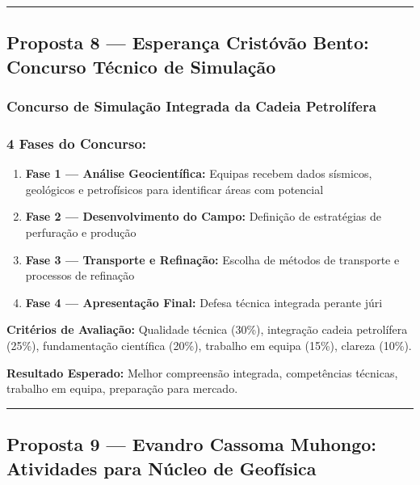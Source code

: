 \documentclass[12pt,a4paper]{article}
\begin{document}
\textcolor{spe-secondary}{\hspace{0.5cm}\rule{0.4\linewidth}{0.8pt}}

\subsection{Proposta 8 — Esperança Cristóvão Bento: Concurso Técnico de Simulação}

\subsubsection*{Concurso de Simulação Integrada da Cadeia Petrolífera}

\subsubsection*{4 Fases do Concurso:}

\begin{enumerate}[itemsep=0.15cm]
    \item \textbf{Fase 1 — Análise Geocientífica:} Equipas recebem dados sísmicos, geológicos e petrofísicos para identificar áreas com potencial
    
    \item \textbf{Fase 2 — Desenvolvimento do Campo:} Definição de estratégias de perfuração e produção
    
    \item \textbf{Fase 3 — Transporte e Refinação:} Escolha de métodos de transporte e processos de refinação
    
    \item \textbf{Fase 4 — Apresentação Final:} Defesa técnica integrada perante júri
\end{enumerate}

\textbf{Critérios de Avaliação:} Qualidade técnica (30\%), integração cadeia petrolífera (25\%), fundamentação científica (20\%), trabalho em equipa (15\%), clareza (10\%).

\textbf{Resultado Esperado:} Melhor compreensão integrada, competências técnicas, trabalho em equipa, preparação para mercado.

\textcolor{spe-secondary}{\hspace{0.5cm}\rule{0.4\linewidth}{0.8pt}}

\subsection{Proposta 9 — Evandro Cassoma Muhongo: Atividades para Núcleo de Geofísica}
\end{document}
